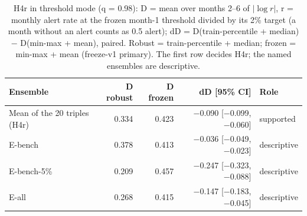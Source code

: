 \begin{table}[t]
\centering
\small
\setlength{\tabcolsep}{4pt}
\caption{H4r in threshold mode (q = 0.98): D = mean over months 2--6 of $|\log r|$, r = monthly alert rate at the frozen month-1 threshold divided by its 2\% target (a month without an alert counts as 0.5 alert); dD = D(train-percentile + median) $-$ D(min-max + mean), paired. Robust = train-percentile + median; frozen = min-max + mean (freeze-v1 primary). The first row decides H4r; the named ensembles are descriptive.}
\label{tab:h4r-summary}
\begin{tabular}{lrrrl}
\toprule
Ensemble & D robust & D frozen & dD [95\% CI] & Role \\
\midrule
Mean of the 20 triples (H4r) & 0.334 & 0.423 & −0.090 [−0.099, −0.060] & supported \\
E-bench & 0.378 & 0.413 & −0.036 [−0.049, −0.023] & descriptive \\
E-bench-5\% & 0.209 & 0.457 & −0.247 [−0.323, −0.088] & descriptive \\
E-all & 0.268 & 0.415 & −0.147 [−0.183, −0.045] & descriptive \\
\bottomrule
\end{tabular}
\end{table}
